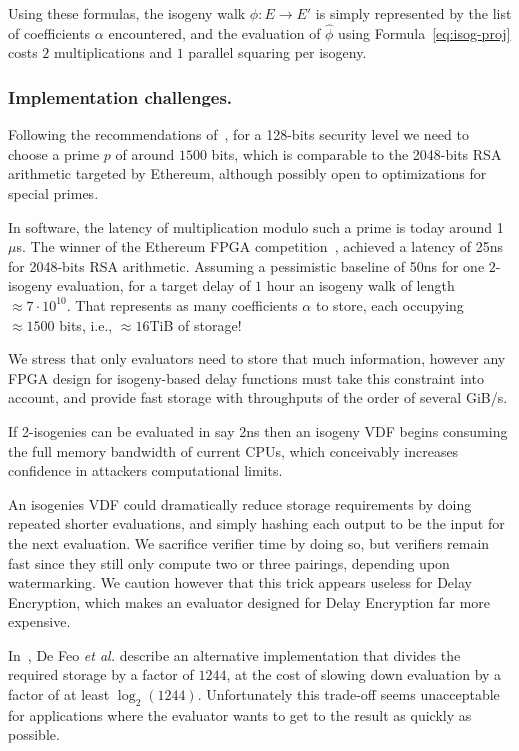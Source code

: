 \documentclass{llncs}
\begin{document}
Using these formulas, the isogeny walk $\phi:E\to E'$ is simply
represented by the list of coefficients $\alpha$ encountered, and the
evaluation of $\hat\phi$ using Formula~\eqref{eq:isog-proj} costs $2$
multiplications and $1$ parallel squaring per isogeny.

\subsubsection{Implementation challenges.}
Following the recommendations of~\cite{10.1007/978-3-030-34578-5_10},
for a 128-bits security level we need to choose a prime $p$ of around
$1500$ bits, which is comparable to the 2048-bits RSA arithmetic
targeted by Ethereum, although possibly open to optimizations for
special primes.

In software, the latency of multiplication modulo such a prime is
today around 1$\mu$s. %
The winner of the Ethereum FPGA competition~\cite{ethereum-vdf},
achieved a latency of 25ns for 2048-bits RSA arithmetic. %
Assuming a pessimistic baseline of 50ns for one $2$-isogeny
evaluation, for a target delay of $1$ hour an isogeny walk of length
$\approx 7\cdot 10^{10}$. %
That represents as many coefficients $\alpha$ to store, each occupying
$\approx 1500$ bits, i.e., $\approx 16$TiB of storage!

We stress that only evaluators need to store that much information,
however any FPGA design for isogeny-based delay functions must take
this constraint into account, and provide fast storage with
throughputs of the order of several GiB/s. %

If 2-isogenies can be evaluated in say 2ns then an isogeny VDF begins
consuming the full memory bandwidth of current CPUs, which conceivably
increases confidence in attackers computational limits. 

An isogenies VDF could dramatically reduce storage requirements by
doing repeated shorter evaluations, and simply hashing each output
to be the input for the next evaluation.  We sacrifice verifier time
by doing so, but verifiers remain fast since they still only compute
two or three pairings, depending upon watermarking.  We caution however
that this trick appears useless for Delay Encryption, which makes
an evaluator designed for Delay Encryption far more expensive. 

In~\cite{10.1007/978-3-030-34578-5_10}, De Feo \emph{et al.} describe
an alternative implementation that divides the required storage by a
factor of $1244$, at the cost of slowing down evaluation by a factor
of at least $\log_2(1244)$. %
Unfortunately this trade-off seems unacceptable for applications where
the evaluator wants to get to the result as quickly as possible. %
\end{document}
